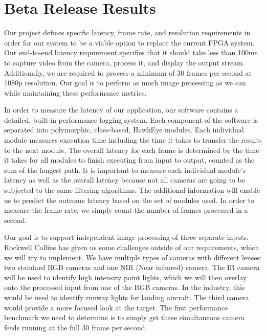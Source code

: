 \documentclass[letterpaper,10pt,titlepage]{IEEEtran}
\begin{document}
\section{Beta Release Results}
   Our project defines specific latency, frame rate, and resolution requirements in order for our system to be a viable option to replace the current FPGA system. Our end-to-end latency requirement specifies that it should take less than 100ms to capture video from the camera, process it, and display the output stream. Additionally, we are required to process a minimum of 30 frames per second at 1080p resolution. Our goal is to perform as much image processing as we can while maintaining these performance metrics.\\
\par
In order to measure the latency of our application, our software contains a detailed, built-in performance logging system. Each component of the software is separated into polymorphic, class-based, HawkEye modules. Each individual module measures execution time including the time it takes to transfer the results to the next module. The overall latency for each frame is determined by the time it takes for all modules to finish executing from input to output, counted as the sum of the longest path. It is important to measure each individual module's latency as well as the overall latency because not all cameras are going to be subjected to the same filtering algorithms. The additional information will enable us to predict the outcome latency based on the set of modules used. In order to measure the frame rate, we simply count the number of frames processed in a second.\\
\par
Our goal is to support independent image processing of three separate inputs. Rockwell Collins has given us some challenges outside of our requirements, which we will try to implement. We have multiple types of cameras with different lenses: two standard RGB cameras and one NIR (Near infrared) camera. The IR camera will be used to identify high intensity point lights, which we will then overlay onto the processed input from one of the RGB cameras. In the industry, this would be used to identify runway lights for landing aircraft. The third camera would provide a more focused look at the target. The first performance benchmark we need to determine is to simply get three simultaneous camera feeds running at the full 30 frame per second.\\
\end{document}
